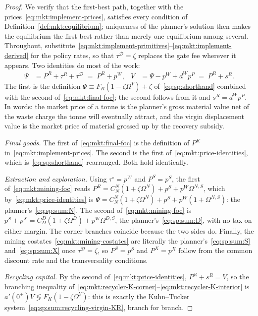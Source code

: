 \begin{proof}
We verify that the first-best path, together with the prices~\eqref{eq:mkt:implement-prices}, satisfies
every condition of Definition~\ref{def:mkt:equilibrium}; uniqueness of the planner's solution then
makes the equilibrium the first best rather than merely one equilibrium among several. Throughout,
substitute~\eqref{eq:mkt:implement-primitives}--\eqref{eq:mkt:implement-derived} for the policy rates,
so that $\tau^{\mathcal D}=\zeta$ replaces the gate fee wherever it appears. Two identities do most of
the work:
\begin{align}
\Psi &= P^R+\tau^R+\tau^{\mathcal D} \;=\; P^R+p^W,
&
V &= \Psi-p^W+d^Wp^P \;=\; P^R+s^R .
\label{eq:mkt:price-identities}
\end{align}
The first is the definition $\Psi\equiv F_R\left(1-\zeta\Omega^Y\right)+\zeta$
of~\eqref{eq:sp:shorthand} combined with the second of~\eqref{eq:mkt:final-foc}; the second follows
from it and $s^R=d^Wp^P$. In words: the market price of a tonne is the planner's gross material value
net of the waste charge the tonne will eventually attract, and the virgin displacement value is the
market price of material grossed up by the recovery subsidy.

\emph{Final goods.} The first of~\eqref{eq:mkt:final-foc} is the definition of $P^K$
in~\eqref{eq:mkt:implement-prices}. The second is the first of~\eqref{eq:mkt:price-identities},
which is~\eqref{eq:sp:shorthand} rearranged. Both hold identically.

\emph{Extraction and exploration.} Using $\tau^{\circ}=p^W$ and $P^S=p^S$, the first
of~\eqref{eq:mkt:mining-foc} reads $P^R=C^N_N\left(1+\zeta\Omega^N\right)+p^S+p^W\Omega^{N,S}$, which
by~\eqref{eq:mkt:price-identities} is $\Psi=C^N_N\left(1+\zeta\Omega^N\right)+p^S+p^W\left(1+\Omega^{N,S}\right)$:
the planner's~\eqref{eq:sp:sum:N}. The second of~\eqref{eq:mkt:mining-foc} is
$p^S+p^X=C^D_D\left(1+\zeta\Omega^D\right)+p^W\Omega^{D,S}$, the planner's~\eqref{eq:sp:sum:D},
with no tax on either margin. The corner branches coincide because the two sides do. Finally,
the mining costates~\eqref{eq:mkt:mining-costates} are literally the planner's~\eqref{eq:sp:sum:S}
and~\eqref{eq:sp:sum:X} once $\tau^{\mathcal D}=\zeta$, so $P^S=p^S$ and $P^X=p^X$ follow from the
common discount rate and the transversality conditions.

\emph{Recycling capital.} By the second of~\eqref{eq:mkt:price-identities}, $P^R+s^R=V$, so the
branching inequality of~\eqref{eq:mkt:recycler-K-corner}--\eqref{eq:mkt:recycler-K-interior} is
$a'\!\left(0^+\right)V\lessgtr F_K\left(1-\zeta\Omega^Y\right)$: this is exactly the Kuhn--Tucker
system~\eqref{eq:sp:sum:recycling-virgin-KR}, branch for branch.


\end{proof}
